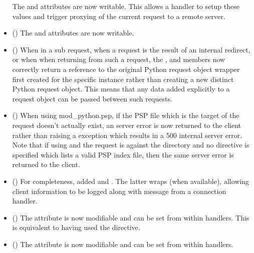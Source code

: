 \begin{itemize}
      The  and  attributes are now writable.
      This allows a handler to setup these values and trigger proxying of the
      current request to a remote server.
    \item
      ()
      The  and  attributes are
      now writable.
    \item
      ()
      When in a sub request, when a request is the result of an internal
      redirect, or when when returning from such a request, the
      ,  and  members now
      correctly return a reference to the original Python request object
      wrapper first created for the specific  instance
      rather than creating a new distinct Python request object. This means
      that any data added explicitly to a request object can be passed
      between such requests.
    \item
      ()
      When using mod_python.psp, if the PSP file which is the target of the
      request doesn't actually exist, an  server
      error is now returned to the client rather than raising a
       exception which results in a 500 internal server error.
      Note that if using  and the request is against the
      directory and no  directive is specified which
      lists a valid PSP index file, then the same 
      server error is returned to the client.
    \item
      ()
      For completeness, added  and
      . The latter wraps
       (when available), allowing client information
      to be logged along with message from a connection handler.
    \item
      ()
      The attribute  is now modifiable and can
      be set from within handlers. This is equivalent to having used the
       directive.
    \item
      ()
      The attribute  is now modifiable and can be set from
      within handlers.
  \end{itemize}

